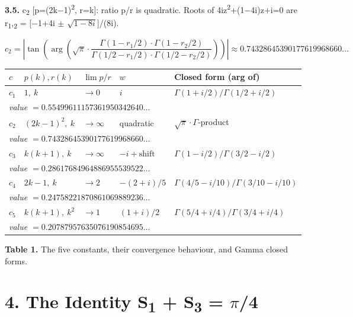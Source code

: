 \documentclass[11pt]{article}
\begin{document}
\textbf{3.5.} c\textsubscript{2} {[}p=(2k−1)\textsuperscript{2}, r=k{]}:
ratio p/r is quadratic. Roots of 4iz\textsuperscript{2}+(1−4i)z+i=0 are
r\textsubscript{1},\textsubscript{2} = {[}−1+4i \(\pm\)
\(\sqrt{1−8i}\){]}/(8i).

\[c_2 = \left|\tan\!\left(\arg\!\left(\sqrt{\pi} \cdot \frac{\Gamma(1-r_1/2)\cdot\Gamma(1-r_2/2)}{\Gamma(1/2-r_1/2)\cdot\Gamma(1/2-r_2/2)}\right)\right)\right| \approx 0.74328645390177619968660\ldots\]

\begin{table}[h]
\centering
\begin{tabular}{@{}lllll@{}}
\toprule
$c$ & $p(k), r(k)$ & $\lim p/r$ & $w$ & Closed form (arg of) \\
\midrule
$c_1$ & $1,\ k$ & $\to 0$ & $i$ & $\Gamma(1+i/2)/\Gamma(1/2+i/2)$ \\
\multicolumn{5}{l}{\quad\itshape value $= 0.55499611157361950342640\ldots$} \\
\midrule
$c_2$ & $(2k-1)^2,\ k$ & $\to \infty$ & quadratic & $\sqrt{\pi} \cdot \Gamma$-product \\
\multicolumn{5}{l}{\quad\itshape value $= 0.74328645390177619968660\ldots$} \\
\midrule
$c_3$ & $k(k+1),\ k$ & $\to \infty$ & $-i+\text{shift}$ & $\Gamma(1-i/2)/\Gamma(3/2-i/2)$ \\
\multicolumn{5}{l}{\quad\itshape value $= 0.28617684964886955539522\ldots$} \\
\midrule
$c_4$ & $2k-1,\ k$ & $\to 2$ & $-(2+i)/5$ & $\Gamma(4/5-i/10)/\Gamma(3/10-i/10)$ \\
\multicolumn{5}{l}{\quad\itshape value $= 0.24758221870861069889236\ldots$} \\
\midrule
$c_5$ & $k(k+1),\ k^2$ & $\to 1$ & $(1+i)/2$ & $\Gamma(5/4+i/4)/\Gamma(3/4+i/4)$ \\
\multicolumn{5}{l}{\quad\itshape value $= 0.20787957635076190854695\ldots$} \\
\bottomrule
\end{tabular}
\end{table}

\textbf{Table 1.} The five constants, their convergence behaviour, and Gamma closed forms.

\hypertarget{the-identity-s-s-4}{%
\section{\texorpdfstring{4. The Identity S\textsubscript{1} +
S\textsubscript{3} =
\(\pi\)/4}{4. The Identity S + S = /4}}\label{the-identity-s-s-4}}
\end{document}

